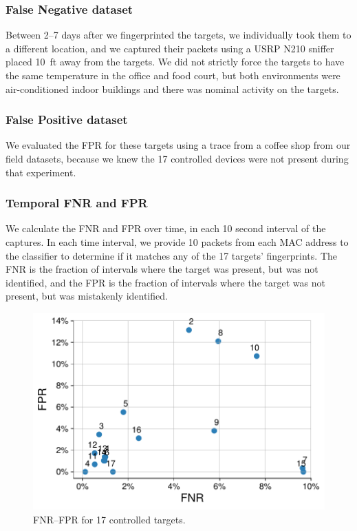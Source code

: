 \subsubsection*{False Negative dataset} Between 2--7 days after we
fingerprinted the targets, we individually took them to a different location,
and we captured their packets using a USRP N210 sniffer placed
10~ft away from the targets. We did not strictly force the targets to have the
same temperature in the office and food court, but both environments were
air-conditioned indoor buildings and there was nominal activity on the targets.

\subsubsection*{False Positive dataset} We evaluated the FPR for these targets
using a trace from a coffee shop from our field datasets, because we knew the
17 controlled devices were not present during that experiment.

\subsubsection*{Temporal FNR and FPR} We calculate the FNR and FPR over time,
in each 10 second interval of the captures. In each time interval, we provide 10
packets from each MAC address to the classifier to determine if it matches any
of the 17 targets' fingerprints. The FNR is the fraction of intervals where the
target was present, but was not identified, and the FPR is the fraction of
intervals where the target was not present, but was mistakenly identified.

\begin{figure}[t!]
    \centering
    \includegraphics[width = \linewidth]{bletracking/plots/fpr_fnr2.pdf} 
    \caption{FNR--FPR for 17 controlled targets.}
    \label{fig:fpr_fnr}
\end{figure}

